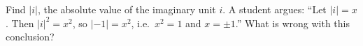 Find $|i|$, the absolute value of the imaginary unit $i$. A student argues: ``Let $|i|=x$. Then $|i|^2=x^2$, so $|-1|=x^2$, i.e.\ $x^2=1$ and $x=\pm1$.'' What is wrong with this conclusion?
